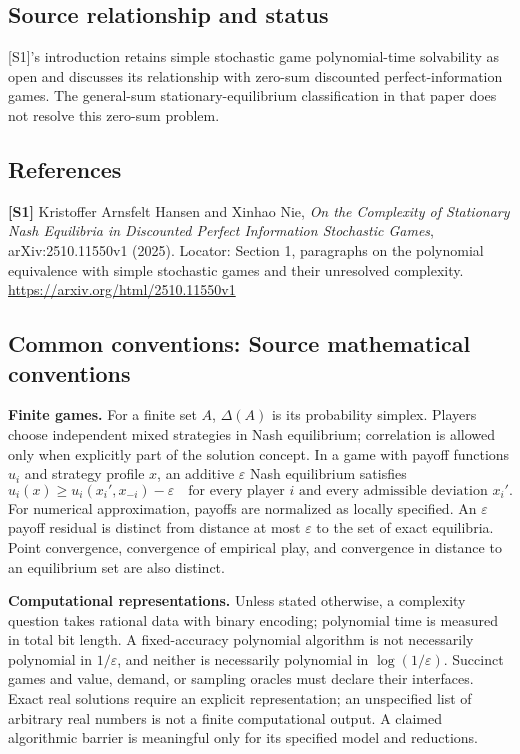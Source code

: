 \documentclass[11pt,a4paper]{article}
\begin{document}
\subsection*{Source relationship and status}
[S1]'s introduction retains simple stochastic game polynomial-time solvability as open and discusses its relationship with zero-sum discounted perfect-information games. The general-sum stationary-equilibrium classification in that paper does not resolve this zero-sum problem.
\subsection*{References}
\begingroup\footnotesize\raggedright
\textbf{[S1]} Kristoffer Arnsfelt Hansen and Xinhao Nie, \emph{On the Complexity of Stationary Nash Equilibria in Discounted Perfect Information Stochastic Games}, arXiv:2510.11550v1 (2025). Locator: Section 1, paragraphs on the polynomial equivalence with simple stochastic games and their unresolved complexity. \url{https://arxiv.org/html/2510.11550v1}
\par\endgroup

\subsection*{Common conventions: Source mathematical conventions}

\textbf{Finite games.} For a finite set $A$, $\Delta(A)$ is its probability
simplex. Players choose independent mixed strategies in Nash equilibrium;
correlation is allowed only when explicitly part of the solution concept.
In a game with payoff functions $u_i$ and strategy profile $x$, an additive
$\varepsilon$ Nash equilibrium satisfies
\[
 u_i(x)\geq u_i(x_i',x_{-i})-\varepsilon
 \quad\text{for every player $i$ and every admissible deviation $x_i'$}.
\]
For numerical approximation, payoffs are normalized as locally specified.
An $\varepsilon$ payoff residual is distinct from distance at most
$\varepsilon$ to the set of exact equilibria. Point convergence, convergence
of empirical play, and convergence in distance to an equilibrium set are
also distinct.

\textbf{Computational representations.} Unless stated otherwise, a complexity
question takes rational data with binary encoding; polynomial time is measured
in total bit length. A fixed-accuracy polynomial algorithm is not necessarily
polynomial in $1/\varepsilon$, and neither is necessarily polynomial in
$\log(1/\varepsilon)$. Succinct games and value, demand, or sampling oracles
must declare their interfaces. Exact real solutions require an explicit
representation; an unspecified list of arbitrary real numbers is not a
finite computational output. A claimed algorithmic barrier is meaningful
only for its specified model and reductions.
\end{document}

